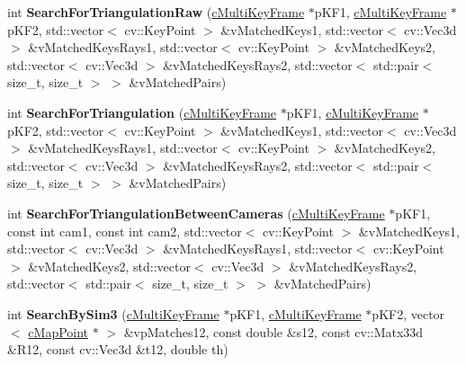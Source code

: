 \begin{DoxyCompactItemize}
\item 
int {\bfseries Search\+For\+Triangulation\+Raw} (\hyperlink{classMultiColSLAM_1_1cMultiKeyFrame}{c\+Multi\+Key\+Frame} $\ast$p\+K\+F1, \hyperlink{classMultiColSLAM_1_1cMultiKeyFrame}{c\+Multi\+Key\+Frame} $\ast$p\+K\+F2, std\+::vector$<$ cv\+::\+Key\+Point $>$ \&v\+Matched\+Keys1, std\+::vector$<$ cv\+::\+Vec3d $>$ \&v\+Matched\+Keys\+Rays1, std\+::vector$<$ cv\+::\+Key\+Point $>$ \&v\+Matched\+Keys2, std\+::vector$<$ cv\+::\+Vec3d $>$ \&v\+Matched\+Keys\+Rays2, std\+::vector$<$ std\+::pair$<$ size\+\_\+t, size\+\_\+t $>$ $>$ \&v\+Matched\+Pairs)\hypertarget{classMultiColSLAM_1_1cORBmatcher_a0b5be1b94ab15370960cf72c5ac6053d}{}\label{classMultiColSLAM_1_1cORBmatcher_a0b5be1b94ab15370960cf72c5ac6053d}

\item 
int {\bfseries Search\+For\+Triangulation} (\hyperlink{classMultiColSLAM_1_1cMultiKeyFrame}{c\+Multi\+Key\+Frame} $\ast$p\+K\+F1, \hyperlink{classMultiColSLAM_1_1cMultiKeyFrame}{c\+Multi\+Key\+Frame} $\ast$p\+K\+F2, std\+::vector$<$ cv\+::\+Key\+Point $>$ \&v\+Matched\+Keys1, std\+::vector$<$ cv\+::\+Vec3d $>$ \&v\+Matched\+Keys\+Rays1, std\+::vector$<$ cv\+::\+Key\+Point $>$ \&v\+Matched\+Keys2, std\+::vector$<$ cv\+::\+Vec3d $>$ \&v\+Matched\+Keys\+Rays2, std\+::vector$<$ std\+::pair$<$ size\+\_\+t, size\+\_\+t $>$ $>$ \&v\+Matched\+Pairs)\hypertarget{classMultiColSLAM_1_1cORBmatcher_aa9938384d5cf304bead23bfdc8fb7dfb}{}\label{classMultiColSLAM_1_1cORBmatcher_aa9938384d5cf304bead23bfdc8fb7dfb}

\item 
int {\bfseries Search\+For\+Triangulation\+Between\+Cameras} (\hyperlink{classMultiColSLAM_1_1cMultiKeyFrame}{c\+Multi\+Key\+Frame} $\ast$p\+K\+F1, const int cam1, const int cam2, std\+::vector$<$ cv\+::\+Key\+Point $>$ \&v\+Matched\+Keys1, std\+::vector$<$ cv\+::\+Vec3d $>$ \&v\+Matched\+Keys\+Rays1, std\+::vector$<$ cv\+::\+Key\+Point $>$ \&v\+Matched\+Keys2, std\+::vector$<$ cv\+::\+Vec3d $>$ \&v\+Matched\+Keys\+Rays2, std\+::vector$<$ std\+::pair$<$ size\+\_\+t, size\+\_\+t $>$ $>$ \&v\+Matched\+Pairs)\hypertarget{classMultiColSLAM_1_1cORBmatcher_af17a70b877cb35e287d94489995acd2f}{}\label{classMultiColSLAM_1_1cORBmatcher_af17a70b877cb35e287d94489995acd2f}

\item 
int {\bfseries Search\+By\+Sim3} (\hyperlink{classMultiColSLAM_1_1cMultiKeyFrame}{c\+Multi\+Key\+Frame} $\ast$p\+K\+F1, \hyperlink{classMultiColSLAM_1_1cMultiKeyFrame}{c\+Multi\+Key\+Frame} $\ast$p\+K\+F2, vector$<$ \hyperlink{classMultiColSLAM_1_1cMapPoint}{c\+Map\+Point} $\ast$ $>$ \&vp\+Matches12, const double \&s12, const cv\+::\+Matx33d \&R12, const cv\+::\+Vec3d \&t12, double th)\hypertarget{classMultiColSLAM_1_1cORBmatcher_a8896a4961a06813653a6260590bd4a27}{}\label{classMultiColSLAM_1_1cORBmatcher_a8896a4961a06813653a6260590bd4a27}


\end{DoxyCompactItemize}
